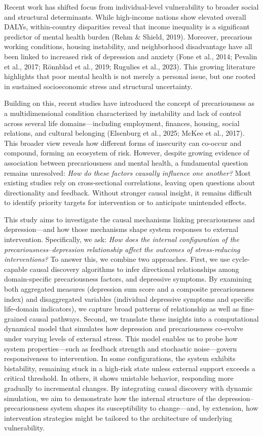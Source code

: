 \documentclass[
]{article}
\begin{document}
Recent work has shifted focus from individual-level vulnerability to
broader social and structural determinants. While high-income nations
show elevated overall DALYs, within-country disparities reveal that
income inequality is a significant predictor of mental health burden
(Rehm \& Shield, 2019). Moreover, precarious working conditions, housing
instability, and neighborhood disadvantage have all been linked to
increased risk of depression and anxiety (Fone et al., 2014; Pevalin et
al., 2017; Rönnblad et al., 2019; Rugulies et al., 2023). This growing
literature highlights that poor mental health is not merely a personal
issue, but one rooted in sustained socioeconomic stress and structural
uncertainty.

Building on this, recent studies have introduced the concept of
precariousness as a multidimensional condition characterized by
instability and lack of control across several life domains---including
employment, finances, housing, social relations, and cultural belonging
(Elsenburg et al., 2025; McKee et al., 2017). This broader view reveals
how different forms of insecurity can co-occur and compound, forming an
ecosystem of risk. However, despite growing evidence of association
between precariousness and mental health, a fundamental question remains
unresolved: \emph{How do these factors causally influence one another?}
Most existing studies rely on cross-sectional correlations, leaving open
questions about directionality and feedback. Without stronger causal
insight, it remains difficult to identify priority targets for
intervention or to anticipate unintended effects.

This study aims to investigate the causal mechanisms linking
precariousness and depression---and how those mechanisms shape system
responses to external intervention. Specifically, we ask: \emph{How does
the internal configuration of the precariousness--depression
relationship affect the outcomes of stress-reducing interventions?} To
answer this, we combine two approaches. First, we use cycle-capable
causal discovery algorithms to infer directional relationships among
domain-specific precariousness factors, and depressive symptoms. By
examining both aggregated measures (depression sum score and a composite
precariousness index) and disaggregated variables (individual depressive
symptoms and specific life-domain indicators), we capture broad patterns
of relationship as well as fine-grained causal pathways. Second, we
translate these insights into a computational dynamical model that
simulates how depression and precariousness co-evolve under varying
levels of external stress. This model enables us to probe how system
properties---such as feedback strength and stochastic noise---govern
responsiveness to intervention. In some configurations, the system
exhibits bistability, remaining stuck in a high-risk state unless
external support exceeds a critical threshold. In others, it shows
unistable behavior, responding more gradually to incremental changes. By
integrating causal discovery with dynamic simulation, we aim to
demonstrate how the internal structure of the depression--precariousness
system shapes its susceptibility to change---and, by extension, how
intervention strategies might be tailored to the architecture of
underlying vulnerability.
\end{document}
